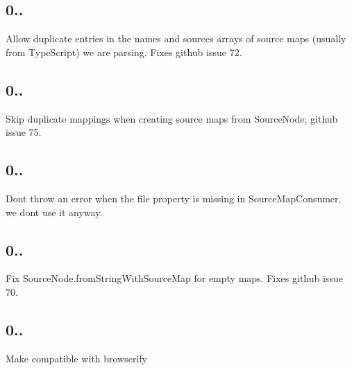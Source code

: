\subsection*{0..}


\begin{DoxyItemize}
\item Allow duplicate entries in the {\ttfamily names} and {\ttfamily sources} arrays of source maps (usually from Type\+Script) we are parsing. Fixes github issue 72.
\end{DoxyItemize}

\subsection*{0..}


\begin{DoxyItemize}
\item Skip duplicate mappings when creating source maps from Source\+Node; github issue 75.
\end{DoxyItemize}

\subsection*{0..}


\begin{DoxyItemize}
\item Don\textquotesingle{}t throw an error when the {\ttfamily file} property is missing in Source\+Map\+Consumer, we don\textquotesingle{}t use it anyway.
\end{DoxyItemize}

\subsection*{0..}


\begin{DoxyItemize}
\item Fix Source\+Node.\+from\+String\+With\+Source\+Map for empty maps. Fixes github issue 70.
\end{DoxyItemize}

\subsection*{0..}


\begin{DoxyItemize}
\item Make compatible with browserify
\end{DoxyItemize}

